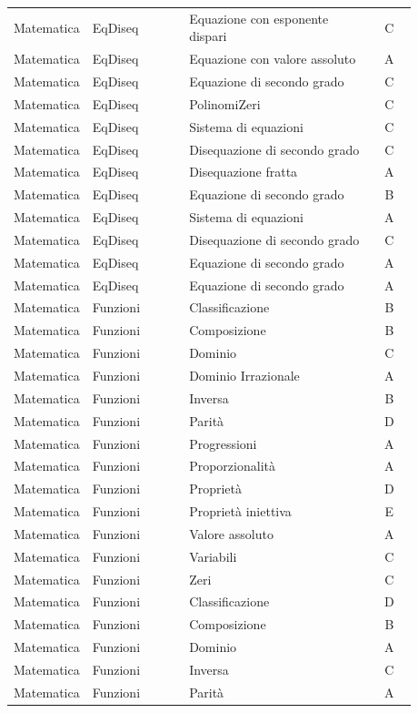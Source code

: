 \documentclass[20pt, a4paper]{article}
\begin{document}
\begin{longtable}{@{}>{\raggedright\arraybackslash}p{0.18\linewidth}>{\raggedright\arraybackslash}p{0.24\linewidth}>{\raggedright\arraybackslash}p{0.46\linewidth}c@{}}
Matematica & EqDiseq & Equazione con esponente dispari & C \\
Matematica & EqDiseq & Equazione con valore assoluto & A \\
Matematica & EqDiseq & Equazione di secondo grado & C \\
Matematica & EqDiseq & PolinomiZeri & C \\
Matematica & EqDiseq & Sistema di equazioni & C \\
Matematica & EqDiseq & Disequazione di secondo grado & C \\
Matematica & EqDiseq & Disequazione fratta & A \\
Matematica & EqDiseq & Equazione di secondo grado & B \\
Matematica & EqDiseq & Sistema di equazioni & A \\
Matematica & EqDiseq & Disequazione di secondo grado & C \\
Matematica & EqDiseq & Equazione di secondo grado & A \\
Matematica & EqDiseq & Equazione di secondo grado & A \\
Matematica & Funzioni & Classificazione & B \\
Matematica & Funzioni & Composizione & B \\
Matematica & Funzioni & Dominio & C \\
Matematica & Funzioni & Dominio Irrazionale & A \\
Matematica & Funzioni & Inversa & B \\
Matematica & Funzioni & Parità & D \\
Matematica & Funzioni & Progressioni & A \\
Matematica & Funzioni & Proporzionalità & A \\
Matematica & Funzioni & Proprietà & D \\
Matematica & Funzioni & Proprietà iniettiva & E \\
Matematica & Funzioni & Valore assoluto & A \\
Matematica & Funzioni & Variabili & C \\
Matematica & Funzioni & Zeri & C \\
Matematica & Funzioni & Classificazione & D \\
Matematica & Funzioni & Composizione & B \\
Matematica & Funzioni & Dominio & A \\
Matematica & Funzioni & Inversa & C \\
Matematica & Funzioni & Parità & A \\

\end{longtable}
\end{document}
